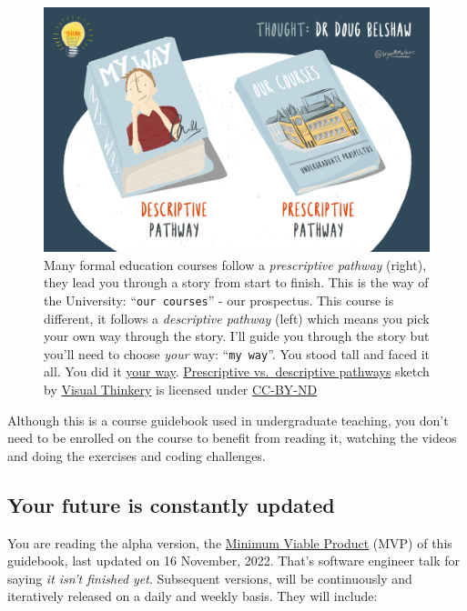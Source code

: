 \documentclass[
]{book}
\begin{document}
\begin{figure}

{\centering \includegraphics[width=1\linewidth]{images/prescriptive-vs-descriptive-pathways} 

}

\caption{Many formal education courses follow a \emph{prescriptive pathway} (right), they lead you through a story from start to finish. This is the way of the University: ``\texttt{our\ courses}'' - our prospectus. This course is different, it follows a \emph{descriptive pathway} (left) which means you pick your own way through the story. I'll guide you through the story but you'll need to choose \emph{your} way: ``\texttt{my\ way}''. You stood tall and faced it all. You did it \href{https://en.wikipedia.org/wiki/My_Way}{your way}. \citep{sinatra} \href{https://bryanmmathers.com/prescriptive-vs-descriptive-pathways/}{Prescriptive vs.~descriptive pathways} sketch by \href{https://visualthinkery.com/}{Visual Thinkery} is licensed under \href{https://creativecommons.org/licenses/by-nd/4.0/}{CC-BY-ND}}\label{fig:descriptive-fig}
\end{figure}



Although this is a course guidebook used in undergraduate teaching, you don't need to be enrolled on the course to benefit from reading it, watching the videos and doing the exercises and coding challenges.

\hypertarget{version}{%
\subsection{Your future is constantly updated}\label{version}}

You are reading the alpha version, the \href{https://en.wikipedia.org/wiki/Minimum_viable_product}{Minimum Viable Product} (MVP) of this guidebook, last updated on 16 November, 2022. That's software engineer talk for saying \emph{it isn't finished yet}. Subsequent versions, will be continuously and iteratively released on a daily and weekly basis. They will include:
\end{document}
